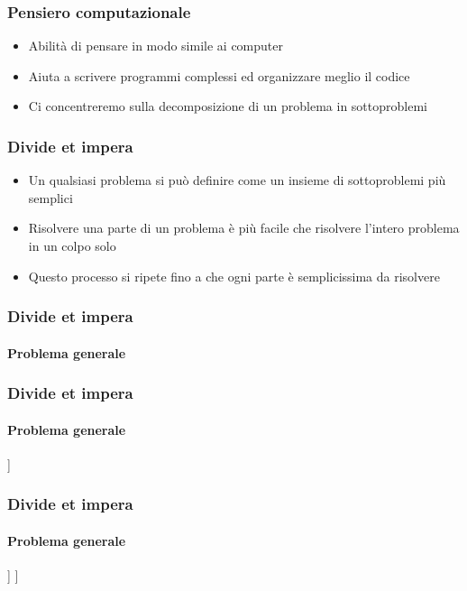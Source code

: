 
\begin{contentframe}
    \frametitle{Pensiero computazionale}

    \begin{itemize}
        \item Abilità di pensare in modo simile ai computer
        \bigskip
        \item Aiuta a scrivere programmi complessi ed organizzare meglio il codice
        \bigskip
        \item Ci concentreremo sulla decomposizione di un problema in sottoproblemi
    \end{itemize}
\end{contentframe}


\begin{contentframe}
    \frametitle{Divide et impera}

    \begin{itemize}
        \item Un qualsiasi problema si può definire come un insieme di sottoproblemi più semplici
        \item Risolvere una parte di un problema è più facile che risolvere l'intero problema in un colpo solo
        \bigskip
        \item Questo processo si ripete fino a che ogni parte è semplicissima da risolvere
    \end{itemize}
\end{contentframe}

\begin{contentframe}
    \frametitle{Divide et impera}
    \framesubtitle{Problema generale}

    \centering
\end{contentframe}


\begin{contentframe}
    \frametitle{Divide et impera}
    \framesubtitle{Problema generale}

    \centering
    \smartarttree[
        Preparare un caffè con la moka
        [Preparare la moka]
        [Far venire su il caffè]
    ]
\end{contentframe}

\begin{contentframe}
    \frametitle{Divide et impera}
    \framesubtitle{Problema generale}

    \centering
    \smartarttree[
        Preparare un caffè con la moka
        [Preparare la moka]
        [Far venire su il caffè
            [Accendere il fuoco]
            [Aspettare che il caffè venga su]
            [Spegnere il fuoco]
        ]
    ]
\end{contentframe}

